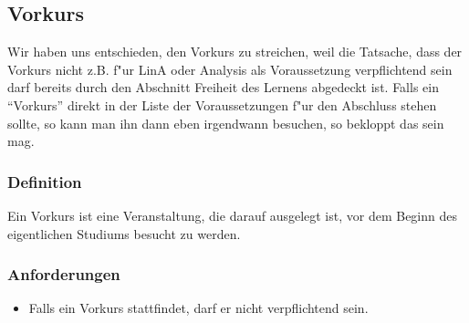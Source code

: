 	\begin{kcmt}\begin{komacmt}

\subsection{Vorkurs}

	Wir haben uns entschieden, den Vorkurs zu streichen, weil die Tatsache, dass der Vorkurs nicht z.B. f"ur LinA oder Analysis als Voraussetzung verpflichtend sein darf bereits durch den Abschnitt Freiheit des Lernens abgedeckt ist.
	Falls ein ``Vorkurs'' direkt in der Liste der Voraussetzungen f"ur den Abschluss stehen sollte, so kann man ihn dann eben irgendwann besuchen, so bekloppt das sein mag.

\subsubsection{Definition}
Ein Vorkurs ist eine Veranstaltung, die darauf ausgelegt ist, vor dem Beginn des eigentlichen Studiums besucht zu werden.

\subsubsection{Anforderungen}
\begin{itemize}
\item Falls ein Vorkurs stattfindet, darf er nicht verpflichtend sein.
\end{itemize}

	\end{komacmt}\end{kcmt}
